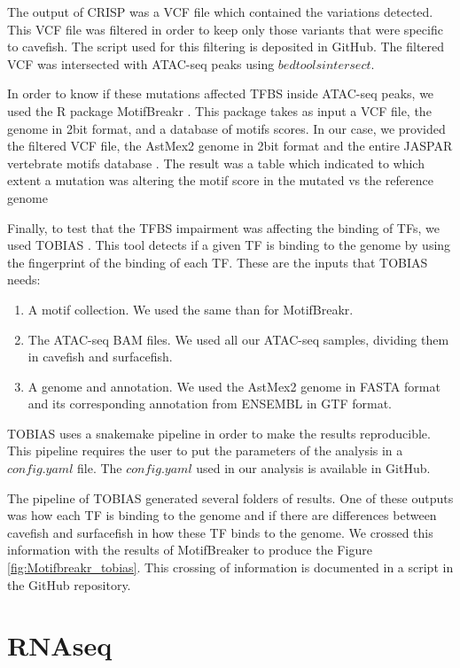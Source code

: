 The output of CRISP was a VCF file which contained the variations detected. This VCF file was filtered in order to keep only those variants that were specific to cavefish. The script used for this filtering is deposited in GitHub. The filtered VCF was intersected with ATAC-seq peaks using $bedtools intersect$. 

In order to know if these mutations affected TFBS inside ATAC-seq peaks, we used the R package MotifBreakr \parencite{coetzee_motifbreakr_2015}. This package takes as input a VCF file, the genome in 2bit format, and a database of motifs scores. In our case, we provided the filtered VCF file, the AstMex2 genome in 2bit format and the entire JASPAR vertebrate motifs database \parencite{castro-mondragon_jaspar_2022}. The result was a table which indicated to which extent a mutation was altering the motif score in the mutated vs the reference genome

Finally, to test that the TFBS impairment was affecting the binding of TFs, we used TOBIAS \parencite{bentsen_atac-seq_2020}. This tool detects if a given TF is binding to the genome by using the fingerprint of the binding of each TF. These are the inputs that TOBIAS needs:
\begin{enumerate}
    \item A motif collection. We used the same than for MotifBreakr.
    \item The ATAC-seq BAM files. We used all our ATAC-seq samples, dividing them in cavefish and surfacefish.
    \item A genome and annotation. We used the AstMex2 genome in FASTA format and its corresponding annotation from ENSEMBL in GTF format.
\end{enumerate}

TOBIAS uses a snakemake pipeline in order to make the results reproducible. This pipeline requires the user to put the parameters of the analysis in a $config.yaml$ file. The $config.yaml$ used in our analysis is available in GitHub.

The pipeline of TOBIAS generated several folders of results. One of these outputs was how each TF is binding to the genome and if there are differences between cavefish and surfacefish in how these TF binds to the genome. We crossed this information with the results of MotifBreaker to produce the Figure \ref{fig:Motifbreakr_tobias}. This crossing of information is documented in a script in the GitHub repository.


\section{RNAseq}
\label{sec:RNAseq}

